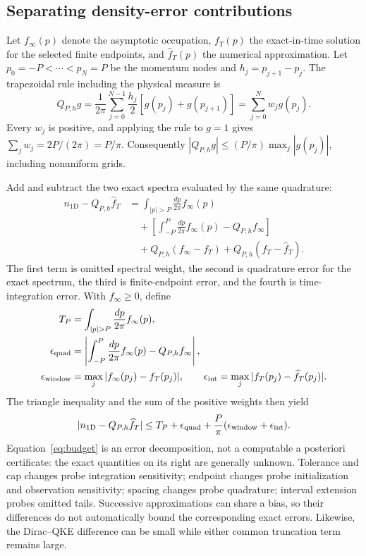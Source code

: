 \documentclass[11pt,a4paper]{article}
\begin{document}
\subsection{Separating density-error contributions}
\label{sec:budget}

Let $f_\infty(p)$ denote the asymptotic occupation, $f_T(p)$ the exact-in-time solution for the selected finite endpoints, and $\widehat f_T(p)$ the numerical approximation. Let $p_0=-P<\cdots<p_N=P$ be the momentum nodes and $h_j=p_{j+1}-p_j$. The trapezoidal rule including the physical measure is
\begin{equation}
 Q_{P,h}g=\frac1{2\pi}\sum_{j=0}^{N-1}\frac{h_j}{2}
          [g(p_j)+g(p_{j+1})]=\sum_{j=0}^{N}w_jg(p_j).
 \label{eq:quadratureweights}
\end{equation}
Every $w_j$ is positive, and applying the rule to $g=1$ gives $\sum_jw_j=2P/(2\pi)=P/\pi$. Consequently $|Q_{P,h}g|\leq(P/\pi)\max_j|g(p_j)|$, including nonuniform grids.

Add and subtract the two exact spectra evaluated by the same quadrature:
\begin{align}
 n_{1\mathrm D}-Q_{P,h}\widehat f_T
 &=\int_{|p|>P}\frac{dp}{2\pi}f_\infty(p)\nonumber\\
 &\quad+\left[\int_{-P}^{P}\frac{dp}{2\pi}f_\infty(p)-Q_{P,h}f_\infty\right]\nonumber\\
 &\quad+Q_{P,h}(f_\infty-f_T)+Q_{P,h}(f_T-\widehat f_T).
 \label{eq:budgetsplit}
\end{align}
The first term is omitted spectral weight, the second is quadrature error for the exact spectrum, the third is finite-endpoint error, and the fourth is time-integration error. With $f_\infty\geq0$, define
\begin{align}
 T_P&=\int_{|p|>P}\frac{dp}{2\pi}f_\infty(p),\nonumber\\
 \epsilon_{\rm quad}&=\left|\int_{-P}^{P}\frac{dp}{2\pi}f_\infty(p)-Q_{P,h}f_\infty\right|,\nonumber\\
 \epsilon_{\rm window}&=\max_j|f_\infty(p_j)-f_T(p_j)|,\qquad
 \epsilon_{\rm int}=\max_j|f_T(p_j)-\widehat f_T(p_j)|.\nonumber
\end{align}
The triangle inequality and the sum of the positive weights then yield
\begin{equation}
 |n_{1\mathrm D}-Q_{P,h}\widehat f_T|
 \leq T_P+\epsilon_{\rm quad}
 +\frac{P}{\pi}(\epsilon_{\rm window}+\epsilon_{\rm int}).
 \label{eq:budget}
\end{equation}
Equation~\eqref{eq:budget} is an error decomposition, not a computable a posteriori certificate: the exact quantities on its right are generally unknown. Tolerance and cap changes probe integration sensitivity; endpoint changes probe initialization and observation sensitivity; spacing changes probe quadrature; interval extension probes omitted tails. Successive approximations can share a bias, so their differences do not automatically bound the corresponding exact errors. Likewise, the Dirac--QKE difference can be small while either common truncation term remains large.
\end{document}
